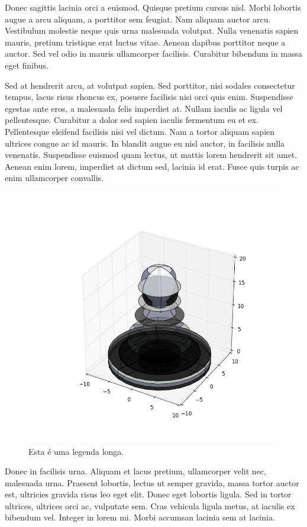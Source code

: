 \documentclass{article}
\begin{document}
	Donec sagittis lacinia orci a euismod. Quisque pretium cursus nisl. Morbi lobortis augue a arcu aliquam, a porttitor sem feugiat. Nam aliquam auctor arcu. Vestibulum molestie neque quis urna malesuada volutpat. Nulla venenatis sapien mauris, pretium tristique erat luctus vitae. Aenean dapibus porttitor neque a auctor. Sed vel odio in mauris ullamcorper facilisis. Curabitur bibendum in massa eget finibus.
	
	Sed at hendrerit arcu, at volutpat sapien. Sed porttitor, nisi sodales consectetur tempus, lacus risus rhoncus ex, posuere facilisis nisi orci quis enim. Suspendisse egestas ante eros, a malesuada felis imperdiet at. Nullam iaculis ac ligula vel pellentesque. Curabitur a dolor sed sapien iaculis fermentum eu et ex. Pellentesque eleifend facilisis nisi vel dictum. Nam a tortor aliquam sapien ultrices congue ac id mauris. In blandit augue eu nisl auctor, in facilisis nulla venenatis. Suspendisse euismod quam lectus, ut mattis lorem hendrerit sit amet. Aenean enim lorem, imperdiet at dictum sed, lacinia id erat. Fusce quis turpis ac enim ullamcorper convallis.
	
	
	\begin{figure}[H]
	\centering
	\includegraphics[width=0.7\linewidth]{figuras/figure_1}
	\caption[Leganda Curta]{Esta é uma legenda longa.}
	\label{fig:figure_1}
	\end{figure}
	
	Donec in facilisis urna. Aliquam et lacus pretium, ullamcorper velit nec, malesuada urna. Praesent lobortis, lectus ut semper gravida, massa tortor auctor est, ultricies gravida risus leo eget elit. Donec eget lobortis ligula. Sed in tortor ultrices, ultrices orci ac, vulputate sem. Cras vehicula ligula metus, at iaculis ex bibendum vel. Integer in lorem mi. Morbi accumsan lacinia sem at lacinia.
	
\end{document}
